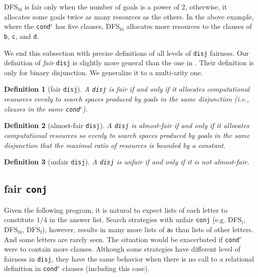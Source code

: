 \documentclass[format=acmlarge, review=true, authordraft=true]{acmart}
\newcommand{\conde}{\texttt{cond$^e$}}
\newcommand{\conj}{\texttt{conj}}
\newcommand{\disj}{\texttt{disj}}
\newcommand{\DFSi }[0]{DFS$_\textrm{i}$}
\newcommand{\DFSf }[0]{DFS$_\textrm{f}$}
\newcommand{\DFSbi}[0]{DFS$_\textrm{bi}$}
\newtheorem{defn}{Definition}[section]
\begin{document}
\begin{center}
	\begin{tabular}{c}
		
	\end{tabular}
\end{center}

\DFSbi{} is fair only when the number of goals is a power of 2, 
otherwise, it allocates some goals twice as many resources as the 
others. In the above example, where the \conde{} has five clauses, \DFSbi{} 
allocates more resources to the clauses of \texttt{b}, \texttt{c}, and 
\texttt{d}.

We end this subsection with precise definitions of all levels of 
\disj{} fairness. Our definition of \emph{fair} \disj{} is slightly 
more general
than the one in \citet{seres1999algebra}. Their definition is only
for binary disjunction. We generalize it to a multi-arity one.

\begin{defn}[fair \disj{}]
A \disj{} is fair if and only if it allocates computational resources evenly to 
search spaces produced by goals in the same disjunction 
(i.e., clauses in the same \conde).
\end{defn}

\begin{defn}[almost-fair \disj{}]
A \disj{} is almost-fair if and only if it allocates computational resources
so evenly to search spaces produced by goals in the same disjunction that 
the maximal ratio of resources is bounded by a constant.
\end{defn}


\begin{defn}[unfair \disj{}]
A \disj{} is unfair if and only if it is not almost-fair.
\end{defn}

\subsection{fair \texttt{conj}}
\label{sec:fairconj}


Given the following program, it is natural to expect lists of each letter to
constitute $1/4$ in the answer list. Search strategies with unfair \conj{} 
(e.g. 
\DFSi, \DFSbi, \DFSf), however, results in many more lists of \texttt{a}s than 
lists of other letters. And some letters are rarely seen. The situation would 
be exacerbated if \conde{} were to contain more clauses.
Although some strategies have different level of fairness in \disj{}, they 
have the same behavior when there is no call to a relational definition in 
\conde{} clauses (including this case).
\end{document}
